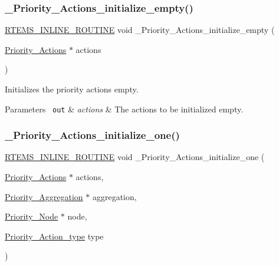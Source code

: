 \subsubsection{\texorpdfstring{\_Priority\_Actions\_initialize\_empty()}{\_Priority\_Actions\_initialize\_empty()}}
{\footnotesize\ttfamily \mbox{\hyperlink{group__RTEMSScoreBaseDefs_gac216239df231d5dbd15e3520b0b9313f}{R\+T\+E\+M\+S\+\_\+\+I\+N\+L\+I\+N\+E\+\_\+\+R\+O\+U\+T\+I\+NE}} void \+\_\+\+Priority\+\_\+\+Actions\+\_\+initialize\+\_\+empty (\begin{DoxyParamCaption}\item[{\mbox{\hyperlink{structPriority__Actions}{Priority\+\_\+\+Actions}} $\ast$}]{actions }\end{DoxyParamCaption})}



Initializes the priority actions empty. 


\begin{DoxyParams}[1]{Parameters}
\mbox{\texttt{ out}}  & {\em actions} & The actions to be initialized empty. \\
\hline
\end{DoxyParams}
\mbox{\label{group__RTEMSScorePriority_gad2be4119adbe29c7da28463477622c8c}} 
\subsubsection{\texorpdfstring{\_Priority\_Actions\_initialize\_one()}{\_Priority\_Actions\_initialize\_one()}}
{\footnotesize\ttfamily \mbox{\hyperlink{group__RTEMSScoreBaseDefs_gac216239df231d5dbd15e3520b0b9313f}{R\+T\+E\+M\+S\+\_\+\+I\+N\+L\+I\+N\+E\+\_\+\+R\+O\+U\+T\+I\+NE}} void \+\_\+\+Priority\+\_\+\+Actions\+\_\+initialize\+\_\+one (\begin{DoxyParamCaption}\item[{\mbox{\hyperlink{structPriority__Actions}{Priority\+\_\+\+Actions}} $\ast$}]{actions,  }\item[{\mbox{\hyperlink{structPriority__Aggregation}{Priority\+\_\+\+Aggregation}} $\ast$}]{aggregation,  }\item[{\mbox{\hyperlink{structPriority__Node}{Priority\+\_\+\+Node}} $\ast$}]{node,  }\item[{\mbox{\hyperlink{group__RTEMSScorePriority_gae6fceeae8a1c66316277dc3b52e3ba27}{Priority\+\_\+\+Action\+\_\+type}}}]{type }\end{DoxyParamCaption})}



